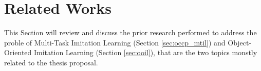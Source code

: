 \section{Related Works}
\label{sec:occp_related_works}
This Section will review and discuss the prior research performed to address the proble of Multi-Task Imitation Learning (Section \ref{sec:occp_mtil}) and Object-Oriented Imitation Learning (Section \ref{sec:ooil}), that are the two topics monstly related to the thesis proposal.


% 